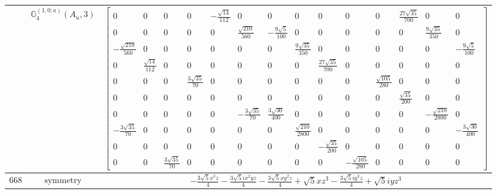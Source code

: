 \documentclass[fleqn,8pt,landscape]{jsarticle}
\begin{document}
\begin{longtable}{ccc}
$  $ & $ \mathbb{G}_{4}^{(1,0;a)}(A_{u},3) $ & $ \begin{bmatrix} 0 & 0 & 0 & 0 & - \frac{\sqrt{14}}{112} & 0 & 0 & 0 & 0 & 0 & 0 & \frac{27 \sqrt{35}}{700} & 0 & 0 \\ 0 & 0 & 0 & 0 & 0 & \frac{\sqrt{210}}{560} & - \frac{9 \sqrt{5}}{100} & 0 & 0 & 0 & 0 & 0 & \frac{9 \sqrt{35}}{350} & 0 \\ - \frac{\sqrt{210}}{560} & 0 & 0 & 0 & 0 & 0 & 0 & \frac{9 \sqrt{35}}{350} & 0 & 0 & 0 & 0 & 0 & - \frac{9 \sqrt{5}}{100} \\ 0 & \frac{\sqrt{14}}{112} & 0 & 0 & 0 & 0 & 0 & 0 & \frac{27 \sqrt{35}}{700} & 0 & 0 & 0 & 0 & 0 \\ 0 & 0 & 0 & \frac{3 \sqrt{35}}{70} & 0 & 0 & 0 & 0 & 0 & 0 & \frac{\sqrt{105}}{280} & 0 & 0 & 0 \\ 0 & 0 & 0 & 0 & 0 & 0 & 0 & 0 & 0 & 0 & 0 & \frac{\sqrt{35}}{200} & 0 & 0 \\ 0 & 0 & 0 & 0 & 0 & - \frac{3 \sqrt{35}}{70} & \frac{3 \sqrt{30}}{400} & 0 & 0 & 0 & 0 & 0 & - \frac{\sqrt{210}}{2800} & 0 \\ - \frac{3 \sqrt{35}}{70} & 0 & 0 & 0 & 0 & 0 & 0 & \frac{\sqrt{210}}{2800} & 0 & 0 & 0 & 0 & 0 & - \frac{3 \sqrt{30}}{400} \\ 0 & 0 & 0 & 0 & 0 & 0 & 0 & 0 & - \frac{\sqrt{35}}{200} & 0 & 0 & 0 & 0 & 0 \\ 0 & 0 & \frac{3 \sqrt{35}}{70} & 0 & 0 & 0 & 0 & 0 & 0 & - \frac{\sqrt{105}}{280} & 0 & 0 & 0 & 0 \end{bmatrix} $ \\ \hline
$ 668 $ & $ \text{symmetry} $ & $ - \frac{3 \sqrt{5} x^{3} z}{4} - \frac{3 \sqrt{5} i x^{2} y z}{4} - \frac{3 \sqrt{5} x y^{2} z}{4} + \sqrt{5} x z^{3} - \frac{3 \sqrt{5} i y^{3} z}{4} + \sqrt{5} i y z^{3} $ \\

\end{longtable}
\end{document}
